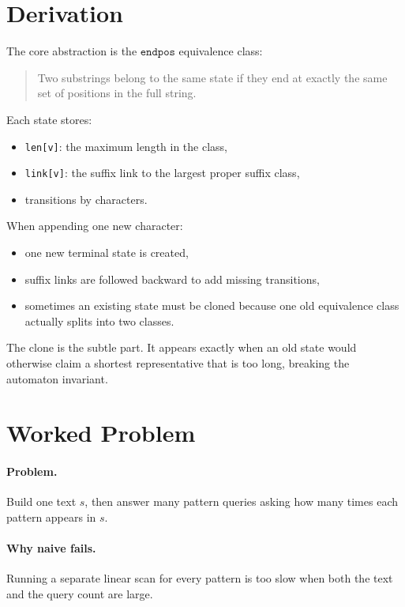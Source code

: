 \section*{Derivation}

The core abstraction is the \(\texttt{endpos}\) equivalence class:

\begin{quote}
Two substrings belong to the same state if they end at exactly the same set of positions in the full string.
\end{quote}

Each state stores:

\begin{itemize}
  \item \texttt{len[v]}: the maximum length in the class,
  \item \texttt{link[v]}: the suffix link to the largest proper suffix class,
  \item transitions by characters.
\end{itemize}

When appending one new character:

\begin{itemize}
  \item one new terminal state is created,
  \item suffix links are followed backward to add missing transitions,
  \item sometimes an existing state must be cloned because one old equivalence class actually splits into two classes.
\end{itemize}

The clone is the subtle part. It appears exactly when an old state would otherwise claim a shortest representative that is
too long, breaking the automaton invariant.

\section*{Worked Problem}

\paragraph{Problem.}
Build one text \(s\), then answer many pattern queries asking how many times each pattern appears in \(s\).

\paragraph{Why naive fails.}
Running a separate linear scan for every pattern is too slow when both the text and the query count are large.

